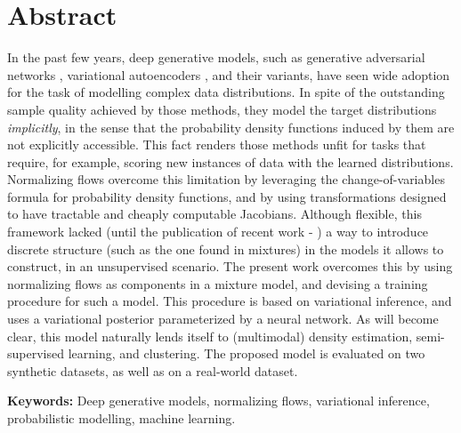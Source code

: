 \section*{Abstract}


In the past few years, deep generative models, such as generative adversarial networks
\autocite{GAN}, variational autoencoders \autocite{vaepaper}, and their variants,
have seen wide adoption for the task of modelling complex data distributions.
In spite of the outstanding sample quality achieved by those methods,
they model the target distributions \emph{implicitly}, in the sense that the probability
density functions induced by them are not explicitly accessible. This fact renders those methods unfit for
tasks that require, for example, scoring new instances of data with the learned
distributions. Normalizing flows overcome this limitation by leveraging the
change-of-variables formula for probability density functions, and by using
transformations designed to have tractable and cheaply computable Jacobians. Although
flexible, this framework lacked (until the publication of recent work -
\autocites{semisuplearning_nflows, RAD}) a way to introduce discrete
structure (such as the one found in mixtures) in the models it allows to
construct, in an unsupervised scenario. The present work overcomes this by using normalizing flows as components in a mixture model,
and devising a training procedure for such a model.
This procedure is based on variational inference, and uses a variational posterior
parameterized by a neural network. As will become clear, this model naturally
lends itself to (multimodal) density estimation, semi-supervised learning, and
clustering. The proposed model is evaluated on two synthetic datasets, as well
as on a real-world dataset.
\vfill

\textbf{\Large Keywords:} Deep generative models, normalizing flows, variational
inference, probabilistic modelling, machine learning.
